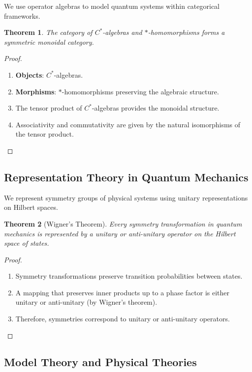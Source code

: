 \documentclass[12pt]{article}
\newtheorem{theorem}{Theorem}[section]
\begin{document}
We use operator algebras to model quantum systems within categorical frameworks.

\begin{theorem}
The category of $C^*$-algebras and $*$-homomorphisms forms a symmetric monoidal category.
\end{theorem}

\begin{proof}
\leavevmode
\begin{enumerate}[label=\arabic*.]
    \item \textbf{Objects}: $C^*$-algebras.
    \item \textbf{Morphisms}: $*$-homomorphisms preserving the algebraic structure.
    \item The tensor product of $C^*$-algebras provides the monoidal structure.
    \item Associativity and commutativity are given by the natural isomorphisms of the tensor product.
\end{enumerate}
\end{proof}

\subsection{Representation Theory in Quantum Mechanics}

We represent symmetry groups of physical systems using unitary representations on Hilbert spaces.

\begin{theorem}[Wigner's Theorem]
Every symmetry transformation in quantum mechanics is represented by a unitary or anti-unitary operator on the Hilbert space of states.
\end{theorem}

\begin{proof}
\leavevmode
\begin{enumerate}[label=\arabic*.]
    \item Symmetry transformations preserve transition probabilities between states.
    \item A mapping that preserves inner products up to a phase factor is either unitary or anti-unitary (by Wigner's theorem).
    \item Therefore, symmetries correspond to unitary or anti-unitary operators.
\end{enumerate}
\end{proof}

\subsection{Model Theory and Physical Theories}
\end{document}
